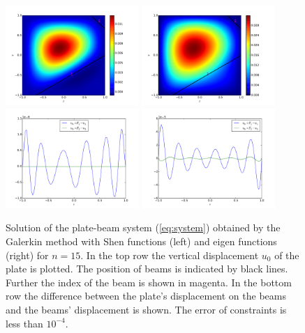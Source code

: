 \documentclass{marine_2015}
\begin{document}
 \begin{figure}[t!]
 \centering
 \includegraphics[width=0.45\textwidth]{img/shen_u0}
 \includegraphics[width=0.45\textwidth]{img/sine_u0}\\
 \includegraphics[width=0.45\textwidth]{img/shen_u0_ur}
 \includegraphics[width=0.45\textwidth]{img/sine_u0_ur}\\
 \caption{
   Solution of the plate-beam system (\ref{eq:system}) obtained by the Galerkin method with Shen
  functions (left) and eigen functions (right) for $n=15$. In the top row the vertical
  displacement $u_0$ of the plate is plotted. The position of beams is indicated
  by black lines. Further the index of the beam is shown in magenta. In the
  bottom row the difference between the plate's displacement on the beams and the
  beams' displacement is shown. The error of constraints is less than $10^{-4}$.
 }
 \label{fig:solutions}
 \end{figure}
\end{document}
